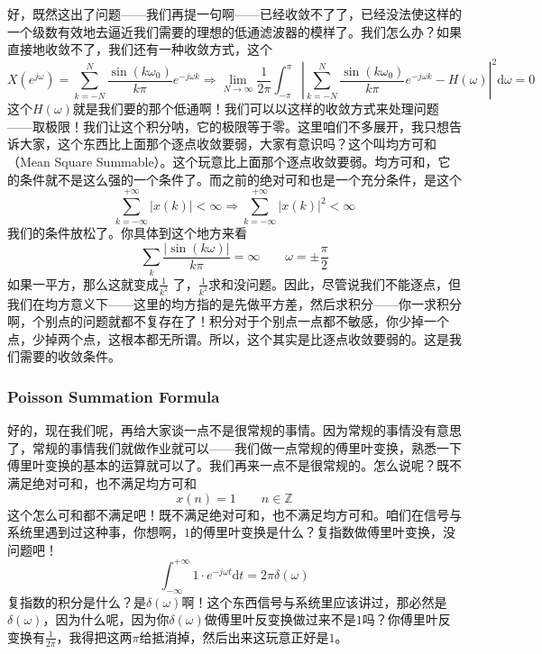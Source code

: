 \documentclass[a4paper,12pt]{article}
\begin{document}
好，既然这出了问题——我们再提一句啊——已经收敛不了了，已经没法使这样的一个级数有效地去逼近我们需要的理想的低通滤波器的模样了。我们怎么办？如果直接地收敛不了，我们还有一种收敛方式，这个
\begin{equation}
    X\left ( e^{j\omega } \right) = \sum_{k=-N}^{N}\frac{\sin \left( k\omega_0 \right)}{k\pi}e^{-j\omega k} \Longrightarrow \lim_{N \to \infty} \frac{1}{2\pi}\int_{-\pi}^{\pi}\left | \sum_{k=-N}^{N}\frac{\sin \left( k\omega_0 \right)}{k\pi}e^{-j\omega k}-H(\omega) \right |^2 \text{d}\omega =0
\end{equation}
这个$H(\omega)$就是我们要的那个低通啊！我们可以以这样的收敛方式来处理问题——取极限！我们让这个积分呐，它的极限等于零。这里咱们不多展开，我只想告诉大家，这个东西比上面那个逐点收敛要弱，大家有意识吗？这个叫均方可和（Mean Square Summable）。这个玩意比上面那个逐点收敛要弱。均方可和，它的条件就不是这么强的一个条件了。而之前的绝对可和也是一个充分条件，是这个
\begin{equation}
   \sum_{k=-\infty}^{+\infty}\left | x(k) \right | < \infty \Longrightarrow \sum_{k=-\infty}^{+\infty}\left |  x\left ( k \right) \right |^2  < \infty
\end{equation}
我们的条件放松了。你具体到这个地方来看
\begin{equation}
    \sum_{k}\frac{\left | \sin \left( k\omega \right)\right | }{k\pi} = \infty \quad\quad \omega = \pm \frac{\pi}{2}
\end{equation}
如果一平方，那么这就变成$\frac{1}{k^2}$
了，$\frac{1}{k^2}$求和没问题。因此，尽管说我们不能逐点，但我们在均方意义下——这里的均方指的是先做平方差，然后求积分——你一求积分啊，个别点的问题就都不复存在了！积分对于个别点一点都不敏感，你少掉一个点，少掉两个点，这根本都无所谓。所以，这个其实是比逐点收敛要弱的。这是我们需要的收敛条件。

\subsubsection{Poisson Summation Formula}\quad

好的，现在我们呢，再给大家谈一点不是很常规的事情。因为常规的事情没有意思了，常规的事情我们就做作业就可以——我们做一点常规的傅里叶变换，熟悉一下傅里叶变换的基本的运算就可以了。我们再来一点不是很常规的。怎么说呢？既不满足绝对可和，也不满足均方可和
\begin{equation}
    x(n) = 1 \quad\quad n\in \mathbb{Z}
\end{equation}
这个怎么可和都不满足吧！既不满足绝对可和，也不满足均方可和。咱们在信号与系统里遇到过这种事，你想啊，$1$的傅里叶变换是什么？复指数做傅里叶变换，没问题吧！
\begin{equation}
    \int_{-\infty}^{+\infty}1\cdot e^{-j\omega t}\text{d}t = 2\pi \delta(\omega)
\end{equation}
复指数的积分是什么？是$\delta(\omega)$啊！这个东西信号与系统里应该讲过，那必然是$\delta(\omega)$，因为什么呢，因为你$\delta(\omega)$做傅里叶反变换做过来不是$1$吗？你傅里叶反变换有$\frac{1}{2\pi}$，我得把这两$\pi$给抵消掉，然后出来这玩意正好是$1$。
\end{document}
